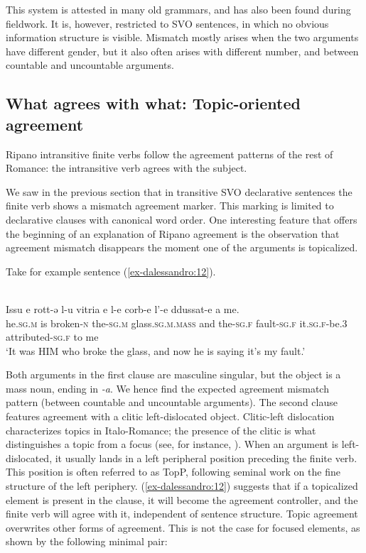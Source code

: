 \documentclass[output=paper
,modfonts
,nonflat]{langsci/langscibook}
\begin{document}
This system is attested in many old grammars, and has also been found during fieldwork. It is, however, restricted to SVO sentences, in which no obvious information structure is visible. Mismatch mostly arises when the two arguments have different gender, but it also often arises with different number, and between countable and uncountable arguments.

\subsection{What agrees with what: Topic-oriented agreement} \label{sec-dalessandro:2.2}
Ripano intransitive finite verbs follow the agreement patterns of the rest of Romance: the intransitive verb agrees with the subject.

We saw in the previous section that in transitive SVO declarative sentences the finite verb shows a mismatch agreement marker. This marking is limited to declarative clauses with canonical word order. One interesting feature that offers the beginning of an explanation of Ripano agreement is the observation that agreement mismatch disappears the moment one of the arguments is topicalized. 

Take for example sentence (\ref{ex-dalessandro:12}). 

\begin{exe}
\ex \label{ex-dalessandro:12}\citet[51]{Rossi2008}\\
\gll Issu   e   rott-ə     l-u     vitria  e   l-e     corb-e   l’-e     ddussat-e     a me.\\
he.\textsc{sg.m} is  broken-\textsc{n} the-\textsc{sg.m} glass.\textsc{sg.m.mass} and  the-\textsc{sg.f} fault-\textsc{sg.f} it.\textsc{sg.f-}be.3  attributed-\textsc{sg.f} to me\\
\glt `It was HIM who broke the glass, and now he is saying it’s my fault.'
\end{exe}
Both arguments in the first clause are masculine singular, but the object is a mass noun, ending in \textit{-a}. We hence find the expected agreement mismatch pattern (between countable and uncountable arguments). The second clause features agreement with a clitic left-dislocated object. Clitic-left dislocation characterizes topics in Italo-Romance; the presence of the clitic is what distinguishes a topic from a focus (see, for instance, \citealt{Cinque1983}). When an argument is left-dislocated, it usually lands in a left peripheral position preceding the finite verb. This position is often referred to as TopP, following  seminal work on the fine structure of the left periphery. 
(\ref{ex-dalessandro:12}) suggests that if a topicalized element is present in the clause, it will become the agreement controller, and the finite verb will agree with it, independent of sentence structure. Topic agreement overwrites other forms of agreement. This is not the case for focused elements, as shown by the following minimal pair:
\end{document}
